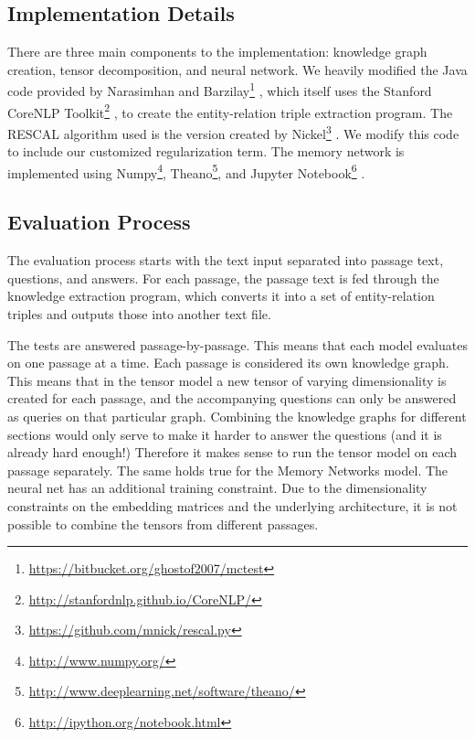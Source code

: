 \documentclass[pageno]{final_paper}
\begin{document}
\subsection{Implementation Details}
\label{Implementation Details}

There are three main components to the implementation: knowledge graph creation,
tensor decomposition, and neural network. We heavily modified the Java code
provided by Narasimhan and
Barzilay\footnote{\url{https://bitbucket.org/ghostof2007/mctest}}
\cite{Narasimhan2015}, which itself uses the Stanford CoreNLP
Toolkit\footnote{\url{http://stanfordnlp.github.io/CoreNLP/}}
\cite{Manning2014}, to create the entity-relation triple extraction program. The
RESCAL algorithm used is the version created by
Nickel\footnote{\url{https://github.com/mnick/rescal.py}} \cite{Nickel2011}. We
modify this code to include our customized regularization term. The memory
network is implemented using Numpy\footnote{\url{http://www.numpy.org/}},
Theano\footnote{\url{http://www.deeplearning.net/software/theano/}}, and Jupyter
Notebook\footnote{\url{http://ipython.org/notebook.html}} \cite{Jones2001,
Perez2007, Bastien2012, Bergstra2010}.

\subsection{Evaluation Process}
\label{Evaluation Process}

The evaluation process starts with the text input separated into passage text,
questions, and answers. For each passage, the passage text is fed through the
knowledge extraction program, which converts it into a set of entity-relation
triples and outputs those into another text file.

The tests are answered passage-by-passage. This means that each model evaluates
on one passage at a time. Each passage is considered its own knowledge graph.
This means that in the tensor model a new tensor of varying dimensionality is
created for each passage, and the accompanying questions can only be answered as
queries on that particular graph. Combining the knowledge graphs for different
sections would only serve to make it harder to answer the questions (and it is
already hard enough!) Therefore it makes sense to run the tensor model on each
passage separately. The same holds true for the Memory Networks model. The
neural net has an additional training constraint. Due to the dimensionality
constraints on the embedding matrices and the underlying architecture, it is
not possible to combine the tensors from different passages.
\end{document}
